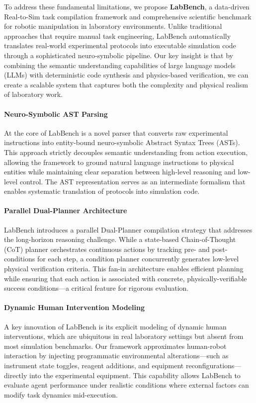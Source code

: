 \documentclass[letterpaper]{article} %
\begin{document}
To address these fundamental limitations, we propose \textbf{LabBench}, a data-driven Real-to-Sim task compilation framework and comprehensive scientific benchmark for robotic manipulation in laboratory environments. Unlike traditional approaches that require manual task engineering, LabBench automatically translates real-world experimental protocols into executable simulation code through a sophisticated neuro-symbolic pipeline. Our key insight is that by combining the semantic understanding capabilities of large language models (LLMs) with deterministic code synthesis and physics-based verification, we can create a scalable system that captures both the complexity and physical realism of laboratory work.

\paragraph{Neuro-Symbolic AST Parsing}
At the core of LabBench is a novel parser that converts raw experimental instructions into entity-bound neuro-symbolic Abstract Syntax Trees (ASTs). This approach strictly decouples semantic understanding from action execution, allowing the framework to ground natural language instructions to physical entities while maintaining clear separation between high-level reasoning and low-level control. The AST representation serves as an intermediate formalism that enables systematic translation of protocols into simulation code.

\paragraph{Parallel Dual-Planner Architecture}
LabBench introduces a parallel Dual-Planner compilation strategy that addresses the long-horizon reasoning challenge. While a state-based Chain-of-Thought (CoT) planner orchestrates continuous actions by tracking pre- and post-conditions for each step, a condition planner concurrently generates low-level physical verification criteria. This fan-in architecture enables efficient planning while ensuring that each action is associated with concrete, physically-verifiable success conditions---a critical feature for rigorous evaluation.

\paragraph{Dynamic Human Intervention Modeling}
A key innovation of LabBench is its explicit modeling of dynamic human interventions, which are ubiquitous in real laboratory settings but absent from most simulation benchmarks. Our framework approximates human-robot interaction by injecting programmatic environmental alterations---such as instrument state toggles, reagent additions, and equipment reconfigurations---directly into the experimental equipment. This capability allows LabBench to evaluate agent performance under realistic conditions where external factors can modify task dynamics mid-execution.
\end{document}
